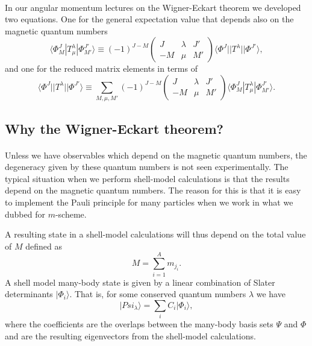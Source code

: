 \documentclass[%
oneside,                 %
final,                   %
10pt]{article}
\begin{document}
\paragraph{}
In our angular momentum lectures on the Wigner-Eckart theorem we developed two equations. 
One for the general expectation value that depends also on the magnetic quantum numbers  
\[
\langle \Phi^J_M|T^{\lambda}_{\mu}|\Phi^{J'}_{M'}\rangle\equiv(-1)^{J-M}\left(\begin{array}{ccc}  J & \lambda & J' \\ -M & \mu & M'\end{array}\right)\langle \Phi^J||T^{\lambda}||\Phi^{J'}\rangle,
\]
and one for the reduced matrix elements in terms of 
\[
\langle \Phi^J||T^{\lambda}||\Phi^{J'}\rangle\equiv\sum_{M,\mu,M'}(-1)^{J-M}\left(\begin{array}{ccc}  J & \lambda & J' \\ -M & \mu & M'\end{array}\right)\langle \Phi^J_M|T^{\lambda}_{\mu}|\Phi^{J'}_{M'}\rangle.
\]





\subsection{Why the Wigner-Eckart theorem?}

\paragraph{}
Unless we have observables which depend on the magnetic quantum numbers, the degeneracy 
given by these quantum numbers is not seen experimentally. 
The typical situation when we perform shell-model calculations is that the results depend on the magnetic quantum numbers. The reason for this is that it is easy to implement the Pauli principle for many particles when we work in what we dubbed for $m$-scheme.

A resulting state in a shell-model calculations will thus depend on the total value of $M$ defined as 
\[
M=\sum_{i=1}^{A}m_{j_i}.
\]
A shell model many-body state is given by a linear combination of Slater determinants $\vert \Phi_i\rangle$. That is, for some conserved quantum numbers $\lambda$  we have
\[
\vert Psi_{\lambda}\rangle = \sum_{i} C_i \vert \Phi_i\rangle,
\]
where the coefficients are the overlaps between the many-body basis sets $\Psi$ and $\Phi$ and are the resulting eigenvectors from the shell-model calculations.
\end{document}
